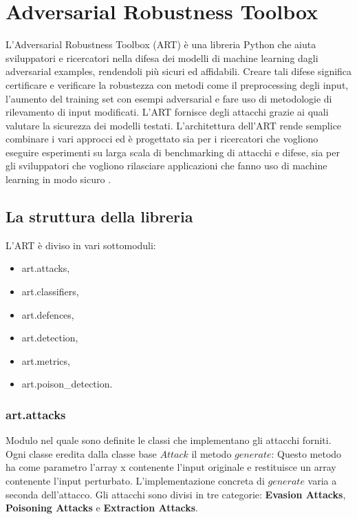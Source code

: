 \newpage
\section{Adversarial Robustness Toolbox}
L'Adversarial Robustness Toolbox (ART) è una libreria Python che aiuta sviluppatori e ricercatori nella difesa dei modelli di machine learning dagli adversarial examples, rendendoli più sicuri 
ed affidabili. Creare tali difese significa certificare e verificare la robustezza con metodi come il preprocessing degli input,  l'aumento del training set
con esempi adversarial e fare uso di metodologie di rilevamento di input modificati. L'ART fornisce degli attacchi grazie ai quali valutare la sicurezza dei modelli
testati. L'architettura dell'ART rende semplice combinare i vari approcci  ed è progettato sia per i ricercatori che vogliono eseguire esperimenti su larga scala di benchmarking di attacchi e difese, sia per gli sviluppatori 
che vogliono rilasciare applicazioni che fanno uso di machine learning in modo sicuro \cite{art2018}.
\subsection{La struttura della libreria}
L'ART è diviso in vari sottomoduli:
\begin{itemize}
    \item art.attacks,
    \item art.classifiers,
    \item art.defences,
    \item art.detection,
    \item art.metrics,
    \item art.poison\_detection.
\end{itemize}

\subsubsection{art.attacks}
Modulo nel quale sono definite  le classi che implementano gli attacchi forniti. Ogni classe eredita dalla classe base  $Attack$ il metodo $generate$: Questo metodo ha come parametro l'array x contenente l'input originale e restituisce
un array contenente l'input perturbato. L'implementazione concreta di $generate$ varia a seconda dell'attacco. Gli attacchi sono divisi in tre categorie: \textbf{Evasion Attacks},
\textbf{Poisoning Attacks} e \textbf{Extraction Attacks}. 
